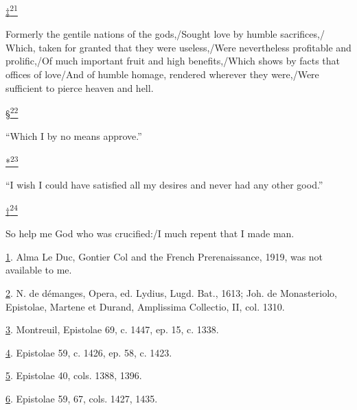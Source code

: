 \protect\hypertarget{23_NOTES.xhtmlux5cux23id_2772}{\protect\hyperlink{22_Chapter_Fourteen__THE_COMING_OF.xhtmlux5cux23id_2771}{‡\textsuperscript{21}}}
Formerly the gentile nations of the gods,/Sought love by humble
sacrifices,/ Which, taken for granted that they were useless,/Were
nevertheless profitable and prolific,/Of much important fruit and high
benefits,/Which shows by facts that offices of love/And of humble
homage, rendered wherever they were,/Were sufficient to pierce heaven
and hell.

\protect\hypertarget{23_NOTES.xhtmlux5cux23id_2770}{\protect\hyperlink{22_Chapter_Fourteen__THE_COMING_OF.xhtmlux5cux23id_2769}{§\textsuperscript{22}}}
``Which I by no means approve.''

\protect\hypertarget{23_NOTES.xhtmlux5cux23id_2768}{\protect\hyperlink{22_Chapter_Fourteen__THE_COMING_OF.xhtmlux5cux23id_2767}{*\textsuperscript{23}}}
``I wish I could have satisfied all my desires and never had any other
good.''

\protect\hypertarget{23_NOTES.xhtmlux5cux23id_2766}{\protect\hyperlink{22_Chapter_Fourteen__THE_COMING_OF.xhtmlux5cux23id_2765}{†\textsuperscript{24}}}
So help me God who was crucified:/I much repent that I made man.

\protect\hypertarget{23_NOTES.xhtmlux5cux23id_123}{\protect\hyperlink{22_Chapter_Fourteen__THE_COMING_OF.xhtmlux5cux23id_122}{1}}.
Alma Le Duc, Gontier Col and the French Prerenaissance, 1919, was not
available to me.

\protect\hypertarget{23_NOTES.xhtmlux5cux23id_121}{\protect\hyperlink{22_Chapter_Fourteen__THE_COMING_OF.xhtmlux5cux23id_120}{2}}.
N. de démanges, Opera, ed. Lydius, Lugd. Bat., 1613; Joh. de
Monasteriolo, Epistolae, Martene et Durand, Amplissima Collectio, II,
col. 1310.

\protect\hypertarget{23_NOTES.xhtmlux5cux23id_119}{\protect\hyperlink{22_Chapter_Fourteen__THE_COMING_OF.xhtmlux5cux23id_118}{3}}.
Montreuil, Epistolae 69, c. 1447, ep. 15, c. 1338.

\protect\hypertarget{23_NOTES.xhtmlux5cux23id_117}{\protect\hyperlink{22_Chapter_Fourteen__THE_COMING_OF.xhtmlux5cux23id_116}{4}}.
Epistolae 59, c. 1426, ep. 58, c. 1423.

\protect\hypertarget{23_NOTES.xhtmlux5cux23id_115}{\protect\hyperlink{22_Chapter_Fourteen__THE_COMING_OF.xhtmlux5cux23id_114}{5}}.
Epistolae 40, cols. 1388, 1396.

\protect\hypertarget{23_NOTES.xhtmlux5cux23id_113}{\protect\hyperlink{22_Chapter_Fourteen__THE_COMING_OF.xhtmlux5cux23id_112}{6}}.
Epistolae 59, 67, cols. 1427, 1435.

